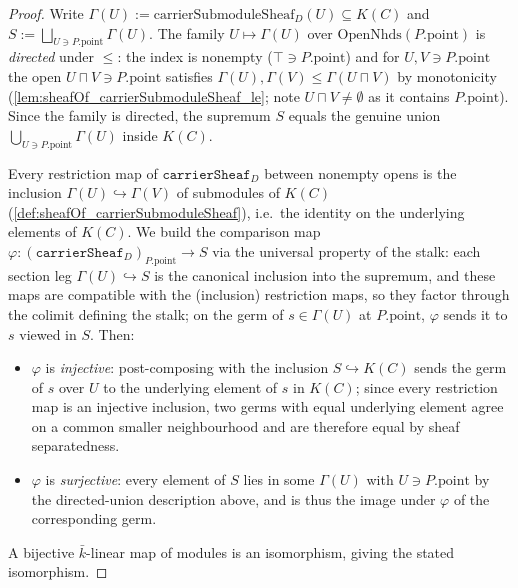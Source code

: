 \begin{proof}
  Write \(\Gamma(U) := \mathrm{carrierSubmoduleSheaf}_D(U) \subseteq K(C)\) and
  \(S := \bigsqcup_{U \ni P.\mathrm{point}} \Gamma(U)\). The family
  \(U \mapsto \Gamma(U)\) over \(\mathrm{OpenNhds}(P.\mathrm{point})\) is
  \emph{directed} under \(\le\): the index is nonempty (\(\top \ni
  P.\mathrm{point}\)) and for \(U, V \ni P.\mathrm{point}\) the open \(U \sqcap V
  \ni P.\mathrm{point}\) satisfies \(\Gamma(U), \Gamma(V) \le \Gamma(U \sqcap
  V)\) by monotonicity (\cref{lem:sheafOf_carrierSubmoduleSheaf_le}; note
  \(U \sqcap V \ne \emptyset\) as it contains \(P.\mathrm{point}\)). Since the
  family is directed, the supremum \(S\) equals the genuine union
  \(\bigcup_{U \ni P.\mathrm{point}} \Gamma(U)\) inside \(K(C)\).

  Every restriction map of \(\texttt{carrierSheaf}_D\) between nonempty opens is
  the inclusion \(\Gamma(U) \hookrightarrow \Gamma(V)\) of submodules of \(K(C)\)
  (\cref{def:sheafOf_carrierSubmoduleSheaf}), i.e.\ the identity on the
  underlying elements of \(K(C)\). We build the comparison map
  \(\varphi : (\texttt{carrierSheaf}_D)_{P.\mathrm{point}} \to S\) via the
  universal property of the stalk: each section leg \(\Gamma(U) \hookrightarrow
  S\) is the canonical inclusion into the supremum, and these maps are compatible
  with the (inclusion) restriction maps, so they factor through the colimit
  defining the stalk; on the germ of \(s \in \Gamma(U)\) at \(P.\mathrm{point}\),
  \(\varphi\) sends it to \(s\) viewed in \(S\). Then:
  \begin{itemize}
  \item \(\varphi\) is \emph{injective}: post-composing with the inclusion
    \(S \hookrightarrow K(C)\) sends the germ of \(s\) over \(U\) to the
    underlying element of \(s\) in \(K(C)\); since every restriction map is an
    injective inclusion, two germs with equal underlying element agree on a
    common smaller neighbourhood and are therefore equal by sheaf separatedness.
  \item \(\varphi\) is \emph{surjective}: every element of \(S\) lies in some
    \(\Gamma(U)\) with \(U \ni P.\mathrm{point}\) by the directed-union
    description above, and is thus the image under \(\varphi\) of the
    corresponding germ.
  \end{itemize}
  A bijective \(\bar k\)-linear map of modules is an isomorphism, giving the
  stated isomorphism.
\end{proof}

